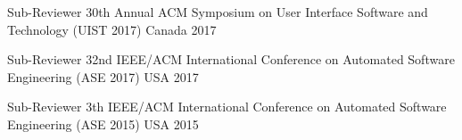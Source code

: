 \begin{cvhonors}
  \cvhonor
    {Sub-Reviewer} %
    {30th Annual {ACM} Symposium on User Interface Software and Technology ({UIST} 2017)} %
    {Canada} %
    {2017} %

  \cvhonor
    {Sub-Reviewer} %
    {32nd {IEEE}/{ACM} International Conference on Automated Software Engineering ({ASE} 2017)} %
    {USA} %
    {2017} %

  \cvhonor
    {Sub-Reviewer} %
    {3th {IEEE}/{ACM} International Conference on Automated Software Engineering ({ASE} 2015)} %
    {USA} %
    {2015} %

\end{cvhonors}
